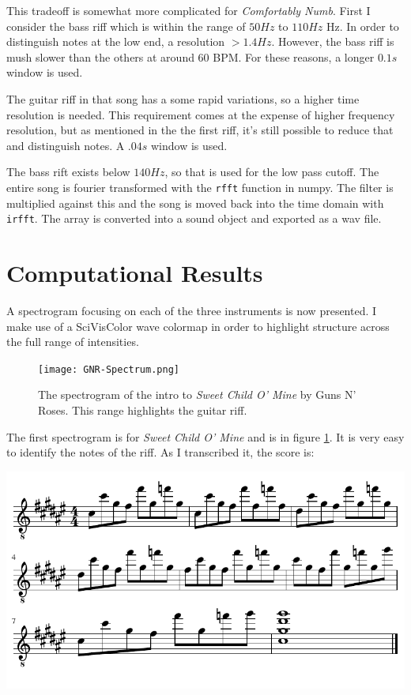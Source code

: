 \documentclass{article}
\begin{document}
    This tradeoff is somewhat more complicated for \textit{Comfortably Numb}. First I consider the bass riff which is within the range of $50 \si{Hz}$ to $110 \si{Hz}$ Hz. In order to distinguish notes at the low end, a resolution $>1.4 \si{Hz}$. However, the bass riff is mush slower than the others at around 60 BPM. For these reasons, a longer $0.1 \si{s}$ window is used.

    The guitar riff in that song has a some rapid variations, so a higher time resolution is needed. This requirement comes at the expense of higher frequency resolution, but as mentioned in the the first riff, it's still possible to reduce that and distinguish notes. A $.04 \si{s}$ window is used.

    The bass rift exists below $140 \si{Hz}$, so that is used for the low pass cutoff. The entire song is fourier transformed with the \lstinline{rfft} function in numpy. The filter is multiplied against this and the song is moved back into the time domain with \lstinline{irfft}. The array is converted into a sound object and exported as a wav file.
    
    \section{Computational Results}
    A spectrogram focusing on each of the three instruments is now presented. I make use of a SciVisColor wave colormap in order to highlight structure across the full range of intensities.

    \begin{figure}[tbp]
        \centering
        \texttt{[image: GNR-Spectrum.png]}
        \caption{The spectrogram of the intro to \textit{Sweet Child O' Mine} by Guns N' Roses. This range highlights the guitar riff.}
        \label{fig:GNR}
    \end{figure}

    The first spectrogram is for \textit{Sweet Child O' Mine} and is in figure \ref{fig:GNR}. It is very easy to identify the notes of the riff. As I transcribed it, the score is:

    \begin{center}
        \includegraphics[width=.9\textwidth]{GNR-score.pdf}
    \end{center}
\end{document}
